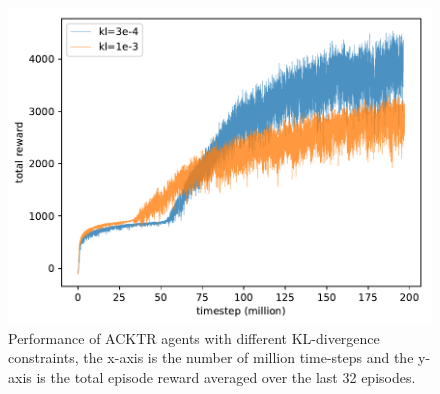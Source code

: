 \begin{figure}[!htbp]
	\includegraphics[width=\textwidth]{images/rec_180612_mix.pdf}
	\centering
	\caption{Performance of ACKTR agents with different KL-divergence constraints, the x-axis is the number of million time-steps and the y-axis is the total episode reward averaged over the last 32 episodes.}\label{rec_mix}
\end{figure}
